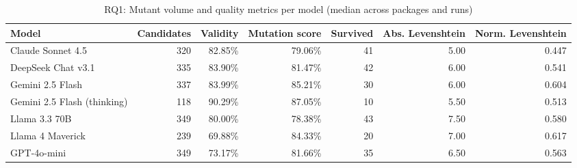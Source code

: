 \begin{table}[htbp]
\centering
{\small
\begin{tabular}{l|rrrrrr}
\hline
\textbf{Model} & \textbf{Candidates} & \textbf{Validity} & \textbf{Mutation score} & \textbf{Survived} & \textbf{Abs. Levenshtein} & \textbf{Norm. Levenshtein} \\
\hline
Claude Sonnet 4.5 & 320 & 82.85\% & 79.06\% & 41 & 5.00 & 0.447 \\
DeepSeek Chat v3.1 & 335 & 83.90\% & 81.47\% & 42 & 6.00 & 0.541 \\
Gemini 2.5 Flash & 337 & 83.99\% & 85.21\% & 30 & 6.00 & 0.604 \\
Gemini 2.5 Flash (thinking) & 118 & 90.29\% & 87.05\% & 10 & 5.50 & 0.513 \\
Llama 3.3 70B & 349 & 80.00\% & 78.38\% & 43 & 7.50 & 0.580 \\
Llama 4 Maverick & 239 & 69.88\% & 84.33\% & 20 & 7.00 & 0.617 \\
GPT-4o-mini & 349 & 73.17\% & 81.66\% & 35 & 6.50 & 0.563 \\
\hline
\end{tabular}
}
\caption{RQ1: Mutant volume and quality metrics per model (median across packages and runs)}
\label{tab:rq1-volume}
\end{table}